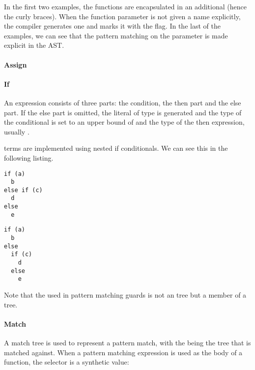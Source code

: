 In the first two examples, the functions are encapsulated in an additional  (hence the curly braces). When the function parameter is not given a name explicitly, the compiler generates one and marks it with the  flag. In the last of the examples, we can see that the pattern matching on the parameter is made explicit in the AST.

\paragraph{Assign} 

\paragraph{If} 

\noindent An  expression consists of three parts: the condition, the then part and the else part. If the else part is omitted, the literal \src{()} of type  is generated and the type of the conditional is set to an upper bound of  and the type of the then expression, usually .

 terms are implemented using nested if conditionals. We can see this in the following listing.

\begin{multicols}{2}
\begin{lstlisting}
if (a)
  b
else if (c)
  d
else
  e

\end{lstlisting}
\begin{lstlisting}
if (a)
  b
else
  if (c)
    d
  else
    e
\end{lstlisting}
\end{multicols}

Note that the  used in pattern matching guards is not an  tree but a member of a  tree.

\paragraph{Match} 

\noindent A match tree is used to represent a pattern match, with the  being the tree that is matched against. When a pattern matching expression is used as the body of a function, the selector is a synthetic value:

